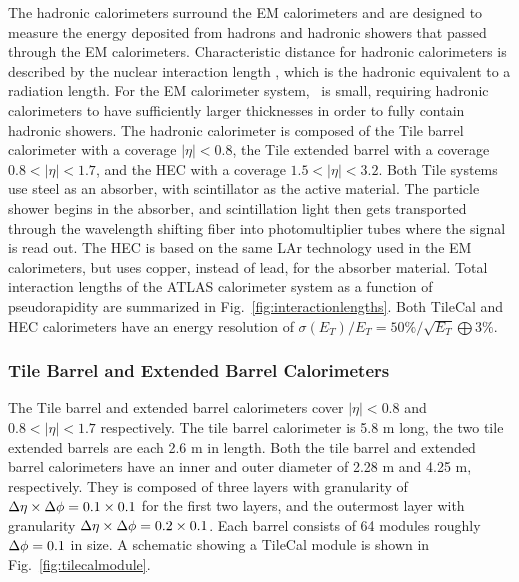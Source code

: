 {The hadronic calorimeters surround the EM calorimeters and are designed to measure the energy deposited from hadrons and hadronic showers that passed through the EM calorimeters. Characteristic distance for hadronic calorimeters is described by the nuclear interaction length \intlen, which is the hadronic equivalent to a radiation length.  For the EM calorimeter system, \intlen\ is small, requiring hadronic calorimeters to have sufficiently larger thicknesses in order to fully contain hadronic showers. The hadronic calorimeter is composed of the Tile barrel calorimeter with a coverage $|\eta|<0.8$, the Tile extended barrel with a coverage $0.8<|\eta|<1.7$, and the HEC with a coverage $1.5<|\eta|<3.2$. Both Tile systems use steel as an absorber, with scintillator as the active material. The particle shower begins in the absorber, and scintillation light then gets transported through the wavelength shifting fiber into photomultiplier tubes where the signal is read out. The HEC is based on the same LAr technology used in the EM calorimeters, but uses copper, instead of lead, for the absorber material. Total interaction lengths of the ATLAS calorimeter system as a function of pseudorapidity are summarized in Fig.~\ref{fig:interactionlengths}. Both TileCal and HEC calorimeters have an energy resolution of $\sigma(E_{T})/E_{T}=50\%/\sqrt{E_{T}}\bigoplus3\%$. 

\subsubsection{Tile Barrel and Extended Barrel Calorimeters}
The Tile barrel and extended barrel calorimeters cover $|\eta|<0.8$ and $0.8<|\eta|<1.7$ respectively. The tile barrel calorimeter is 5.8 m long, the two tile extended barrels are each 2.6 m in length. Both the tile barrel and extended barrel calorimeters have an inner and outer diameter of 2.28 m and 4.25 m, respectively. They is composed of three layers with granularity of $\mbox{$\Delta \eta$}\times\mbox{$\Delta \phi$}=0.1\times0.1$ for the first two layers, and the outermost layer with granularity $\mbox{$\Delta \eta$}\times\mbox{$\Delta \phi$}=0.2\times0.1$. Each barrel consists of 64 modules roughly $\mbox{$\Delta \phi$}=0.1$ in size. A schematic showing a TileCal module is shown in Fig.~\ref{fig:tilecalmodule}.

}
